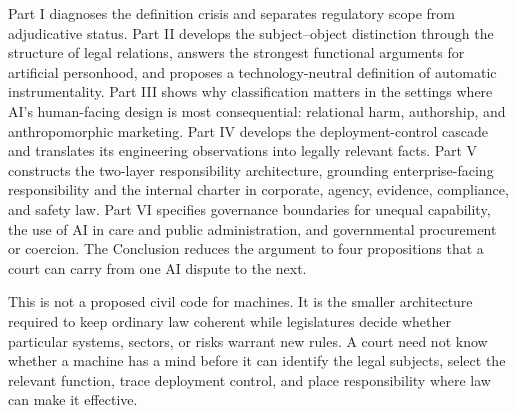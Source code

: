 Part I diagnoses the definition crisis and separates regulatory scope from adjudicative status. Part II develops the subject--object distinction through the structure of legal relations, answers the strongest functional arguments for artificial personhood, and proposes a technology-neutral definition of automatic instrumentality. Part III shows why classification matters in the settings where AI's human-facing design is most consequential: relational harm, authorship, and anthropomorphic marketing. Part IV develops the deployment-control cascade and translates its engineering observations into legally relevant facts. Part V constructs the two-layer responsibility architecture, grounding enterprise-facing responsibility and the internal charter in corporate, agency, evidence, compliance, and safety law. Part VI specifies governance boundaries for unequal capability, the use of AI in care and public administration, and governmental procurement or coercion. The Conclusion reduces the argument to four propositions that a court can carry from one AI dispute to the next.

This is not a proposed civil code for machines. It is the smaller architecture required to keep ordinary law coherent while legislatures decide whether particular systems, sectors, or risks warrant new rules. A court need not know whether a machine has a mind before it can identify the legal subjects, select the relevant function, trace deployment control, and place responsibility where law can make it effective.
